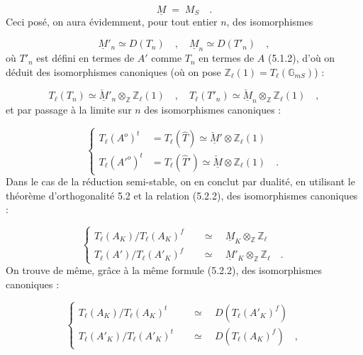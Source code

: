 \begin{equation*}
\underline{M} \;=\; M_S \quad .
\end{equation*}
Ceci posé, on aura évidemment, pour tout entier $n$, des isomorphismes

\begin{equation}\tag{5.5.5}
\underline{M}'_n \simeq D(T_n) \quad , \quad \underline{M}_n \simeq D(T'_n) \quad ,
\end{equation}
où $T'_n$ est défini en termes de $A'$ comme $T_n$ en termes de $A$ (5.1.2), d'où on déduit des isomorphismes canoniques (où on pose $\mathbb{Z}_\ell(1) = T_\ell(\mathbb{G}_{mS})$) :

\begin{equation}\tag{5.5.6}
T_\ell(T_n) \simeq \check{\underline{M}}'_n \otimes_{\mathbb{Z}} \mathbb{Z}_\ell(1) \quad , \quad T_\ell(T'_n) \simeq \check{\underline{M}}_n \otimes_{\mathbb{Z}} \mathbb{Z}_\ell(1) \quad ,
\end{equation}
et par passage à la limite sur $n$ des isomorphismes canoniques :

\begin{equation}\tag{5.5.7}
\left\{\begin{aligned} T_\ell(A^o)^t &= T_\ell(\hat{T}) \simeq \check{\underline{M}}' \otimes \mathbb{Z}_\ell(1)\\[2ex] T_\ell({A'}^o)^t &= T_\ell(\hat{T}') \simeq \check{\underline{M}} \otimes \mathbb{Z}_\ell(1) \quad . \end{aligned}\right.
\end{equation}
Dans le cas de la réduction semi-stable, on en conclut par dualité, en utilisant le théorème d'orthogonalité 5.2 et la relation (5.2.2), des isomorphismes canoniques :

\begin{equation}\tag{5.5.8}
\left\{\begin{aligned} T_\ell(A_K)/T_\ell(A_K)^f \quad &\simeq \quad \underline{M}_K \otimes_{\mathbb{Z}} \mathbb{Z}_\ell\\[2ex] T_\ell(A')/T_\ell(A'_K)^f \quad &\simeq \quad \underline{M}'_K \otimes_{\mathbb{Z}} \mathbb{Z}_\ell \quad . \end{aligned}\right.
\end{equation}
On trouve de même, grâce à la même formule (5.2.2), des isomorphismes canoniques :

\begin{equation}\tag{5.5.9}
\left\{\begin{aligned} T_\ell(A_K)/T_\ell(A_K)^t \quad &\simeq \quad D(T_\ell(A'_K)^f)\\[2ex] T_\ell(A'_K)/T_\ell(A'_K)^t \quad &\simeq \quad D(T_\ell(A_K)^f) \quad , \end{aligned}\right.
\end{equation}

